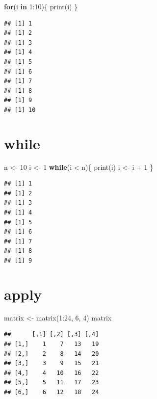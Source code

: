 \documentclass[
]{book}
\newenvironment{Shaded}{\begin{snugshade}}{\end{snugshade}}
\newcommand{\ControlFlowTok}[1]{\textcolor[rgb]{0.13,0.29,0.53}{\textbf{#1}}}
\newcommand{\DecValTok}[1]{\textcolor[rgb]{0.00,0.00,0.81}{#1}}
\newcommand{\FunctionTok}[1]{\textcolor[rgb]{0.00,0.00,0.00}{#1}}
\newcommand{\NormalTok}[1]{#1}
\newcommand{\OtherTok}[1]{\textcolor[rgb]{0.56,0.35,0.01}{#1}}
\newcommand{\SpecialCharTok}[1]{\textcolor[rgb]{0.00,0.00,0.00}{#1}}
\begin{document}
\begin{Shaded}
\begin{Highlighting}[]
\ControlFlowTok{for}\NormalTok{(i }\ControlFlowTok{in} \DecValTok{1}\SpecialCharTok{:}\DecValTok{10}\NormalTok{)\{}
  \FunctionTok{print}\NormalTok{(i)}
\NormalTok{\}}
\end{Highlighting}
\end{Shaded}

\begin{verbatim}
## [1] 1
## [1] 2
## [1] 3
## [1] 4
## [1] 5
## [1] 6
## [1] 7
## [1] 8
## [1] 9
## [1] 10
\end{verbatim}

\hypertarget{while}{%
\section{while}\label{while}}

\begin{Shaded}
\begin{Highlighting}[]
\NormalTok{n }\OtherTok{\textless{}{-}} \DecValTok{10}
\NormalTok{i }\OtherTok{\textless{}{-}} \DecValTok{1}
\ControlFlowTok{while}\NormalTok{(i }\SpecialCharTok{\textless{}}\NormalTok{ n)\{}
  \FunctionTok{print}\NormalTok{(i)}
\NormalTok{  i }\OtherTok{\textless{}{-}}\NormalTok{ i }\SpecialCharTok{+} \DecValTok{1}
\NormalTok{\}}
\end{Highlighting}
\end{Shaded}

\begin{verbatim}
## [1] 1
## [1] 2
## [1] 3
## [1] 4
## [1] 5
## [1] 6
## [1] 7
## [1] 8
## [1] 9
\end{verbatim}

\hypertarget{apply}{%
\section{apply}\label{apply}}

\begin{Shaded}
\begin{Highlighting}[]
\NormalTok{matrix }\OtherTok{\textless{}{-}} \FunctionTok{matrix}\NormalTok{(}\DecValTok{1}\SpecialCharTok{:}\DecValTok{24}\NormalTok{, }\DecValTok{6}\NormalTok{, }\DecValTok{4}\NormalTok{)}
\NormalTok{matrix}
\end{Highlighting}
\end{Shaded}

\begin{verbatim}
##      [,1] [,2] [,3] [,4]
## [1,]    1    7   13   19
## [2,]    2    8   14   20
## [3,]    3    9   15   21
## [4,]    4   10   16   22
## [5,]    5   11   17   23
## [6,]    6   12   18   24
\end{verbatim}
\end{document}
